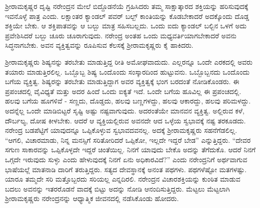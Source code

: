 ಶ‍್ರೀರಾಮಕೃಷ್ಣರ ದೃಷ್ಟಿ ನರೇಂದ್ರನ ಮೇಲೆ ಬಿದ್ದೊಡನೆಯೆ ಗ್ರಹಿಸಿದರು ತಮ್ಮ ಸಾಕ್ಷಾತ್ಕಾರದ ಶಕ್ತಿಯನ್ನು ಹರಿಸುವುದಕ್ಕೆ ಇವನೊಳ್ಳೆ ಪಾತ್ರ ಎಂದು. ಲಕ್ಷಾಂತರ ಕ್ಯಾಂಡಲ್ ಪವರ್ ಬಲ್ಬ್ ಕಾಂತಿಯನ್ನು ಕೊಡಬೇಕಾದರೆ ಅದಕ್ಕೊಂದು ದೊಡ್ಡ ಶಕ್ತಿಯೇ ಬೇಕು. ಆ ಶಕ್ತಿಪಾತವನ್ನು ಆ ಬಲ್ಬು ಮಾತ್ರ ಸಹಿಸಬಲ್ಲದು. ಒಂದು ಐದು ಕ್ಯಾಂಡಲ್ ಬಲ್ಬಿನ ಒಳಗೆ ಅದು ಪ್ರವೇಶಿಸಿದರೆ ಬಲ್ಬು ಚೂರು ಚೂರಾಗುವುದು. ನರೇಂದ್ರ ಅಂತಹ ಒಂದು ಮಧ್ಯವರ್ತಿಯಾಗಬೇಕಾದರೆ ಅವನು ಸಿದ್ಧನಾಗಬೇಕು. ಅವನ ವ್ಯಕ್ತಿತ್ವವನ್ನು ರೂಪಿಸುವ ಕೆಲಸಕ್ಕೆ ಶ‍್ರೀರಾಮಕೃಷ್ಣರು ಕೈ ಹಾಕಿದರು.

ಶ‍್ರೀರಾಮಕೃಷ್ಣರು ಶಿಷ್ಯನನ್ನು ತರಬೇತು ಮಾಡುತ್ತಿದ್ದ ರೀತಿ ಅಮೋಘವಾದುದು. ಎಲ್ಲರನ್ನೂ ಒಂದೇ ಎರಕದಲ್ಲಿ ಅವರು ತಯಾರು ಮಾಡುತ್ತಿರಲಿಲ್ಲ. ಒಬ್ಬೊಬ್ಬ ಶಿಷ್ಯ ಒಂದೊಂದು ಸಂಸ್ಕಾರದಿಂದ ಹುಟ್ಟುವನು. ಒಬ್ಬೊಬ್ಬನದು ಒಂದೊಂದು ಬಗೆಯ ವ್ಯಕ್ತಿತ್ವ. ಶಿಷ್ಯರನ್ನು ತರಬೇತು ಮಾಡುತ್ತಿದ್ದಾಗ ಅವರ ವ್ಯಕ್ತಿತ್ವಕ್ಕೆ ಭಂಗ ಬರದಂತೆ ನೋಡಿಕೊಂಡರು. ಈ ಪ್ರಪಂಚದಲ್ಲಿ ವೈವಿಧ್ಯತೆ ಮತ್ತು ಅದರ ಹಿಂದೆ ಒಂದು ಐಕ್ಯತೆ ಇದೆ. ಒಂದೇ ಬಗೆಯ ಹೂವಿಲ್ಲ ಈ ಪ್ರಪಂಚದಲ್ಲಿ. ಹಲವು ಬಗೆಯ ಹೂಗಳಿವೆ - ಸಣ್ಣದು, ದೊಡ್ಡದು, ಹಲವು ಬಣ್ಣಗಳದ್ದು, ಹಲವು ಆಕಾರದ್ದು, ಹಲವು ಪರಿಮಳದ್ದು. ಅದನ್ನೆಲ್ಲ ಒಂದೇ ಮಾಡಿಬಿಟ್ಟರೆ ಸೃಷ್ಟಿ ಅಷ್ಟು ನಷ್ಟವಾಗುವುದು. ಅದರಂತೆಯೇ ಮಾನವನ ವ್ಯಕ್ತಿತ್ವ. ಅಲ್ಲಿರುವ ಕಳೆ, ದೌರ್ಬಲ್ಯ, ದೋಷ ಕೀಳಬೇಕು. ಆದರೆ ಆ ವ್ಯಕ್ತಿಯಲ್ಲಿರುವ ಅವನದೇ ಆದ ಒಳ್ಳೆಯ ಸ್ವಭಾವಕ್ಕೆ ನಷ್ಟ ತರಕೂಡದು. ನರೇಂದ್ರ ಬಡಪೆಟ್ಟಿಗೆ ಯಾವುದನ್ನೂ ಒಪ್ಪಿಕೊಳ್ಳುವ ಸ್ವಭಾವದವನಲ್ಲ. ಅದಕ್ಕೆ ಶ‍್ರೀರಾಮಕೃಷ್ಣರು ಸಹನೆಗೆಡಲಿಲ್ಲ. “ಆಗಲಿ, ವಿಚಾರಮಾಡು, ನಿನ್ನ ಮನಸ್ಸಿಗೆ ಸರಿತೋರಿದರೆ ಒಪ್ಪಿಕೋ, ಇಲ್ಲದೇ ಇದ್ದರೆ ಬೇಡ” ಎನ್ನುತ್ತಿದ್ದರು. “ದೇವರ ಸಗುಣ ಸಾಕಾರವನ್ನು ಒಪ್ಪಿಕೊಳ್ಳದೇ ಇದ್ದರೆ ಚಿಂತೆಯಿಲ್ಲ. ನಿನಗೆ ಯಾವುದು ಬೇಕೊ ಅದನ್ನು ತೆಗೆದುಕೊ. ಆದರೆ ನಿನಗೆ ಒಗ್ಗದೇ ಇರುವುದು ಸುಳ್ಳು ಎಂದು ಹೇಳುವುದಕ್ಕೆ ನಿನಗೆ ಏನು ಅಧಿಕಾರವಿದೆ?” ಎಂದು ನರೇಂದ್ರನಿಗೆ ಅರ್ಥವಾಗುವ ಭಾಷೆಯಲ್ಲೆ ಮಾತನಾಡಿ ದಾರಿಗೆ ತರುತ್ತಿದ್ದರು. ಸತ್ಯದ ದೇವಸ್ಥಾನಕ್ಕೆ ಅನಂತ ಪಥಗಳು. ಪಥಗಳೆಷ್ಟೋ ಮತಗಳಷ್ಟು. ಯಾರೂ ತಮ್ಮದೇ ಸರಿ ಮತ್ತೊಬ್ಬರದು ಸರಿಯಲ್ಲ ಎನ್ನದಿರಲಿ. ನರೇಂದ್ರನ ವಿಚಾರಶಕ್ತಿಯನ್ನು ಕುಂಠಿತ ಮಾಡುವ ಬದಲು ಅವನನ್ನು ಇತರರೊಡನೆ ವಾದಕ್ಕೆ ಬಿಟ್ಟು ಅದನ್ನು ನೋಡಿ ಆನಂದಿಸುತ್ತಿದ್ದರು. ಮೆಟ್ಟಲು ಮೆಟ್ಟಲಾಗಿ ಶ‍್ರೀರಾಮಕೃಷ್ಣರು ನರೇಂದ್ರನನ್ನು ಆಧ್ಯಾತ್ಮಿಕ ಜೀವನದಲ್ಲಿ ನಡೆಸಿಕೊಂಡು ಹೋದರು.

